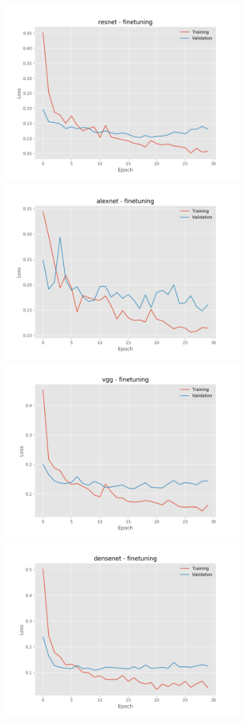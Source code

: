 \documentclass[]{kththesis}
\begin{document}
  \begin{figure}[h]
    \includegraphics[width=9cm]{b_l_resnet_fine}
    \includegraphics[width=9cm]{b_l_alexnet_fine}
    \includegraphics[width=9cm]{b_l_vgg_fine}
    \includegraphics[width=9cm]{b_l_densenet_fine}

\end{figure}
\end{document}
